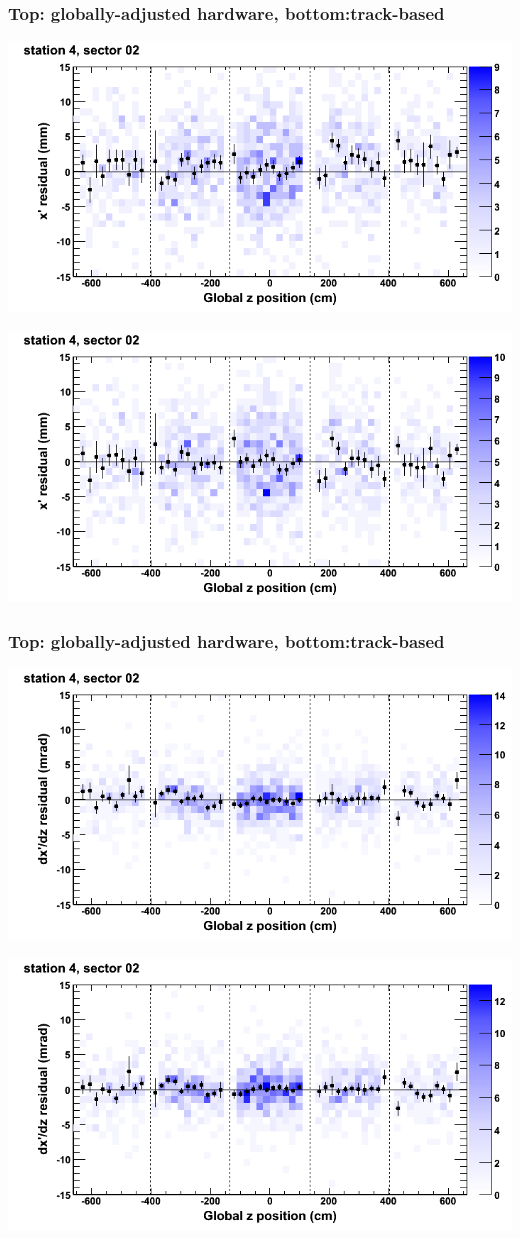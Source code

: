 \documentclass[compress]{beamer}
\begin{document}
\begin{frame}
\frametitle{Top: globally-adjusted hardware, bottom:track-based}
\includegraphics[width=0.7\linewidth]{NOV4_mapplots_HW/DTvsz_st4sec02_x.png}

\includegraphics[width=0.7\linewidth]{NOV4_mapplots/DTvsz_st4sec02_x.png}
\end{frame}

\begin{frame}
\frametitle{Top: globally-adjusted hardware, bottom:track-based}
\includegraphics[width=0.7\linewidth]{NOV4_mapplots_HW/DTvsz_st4sec02_dxdz.png}

\includegraphics[width=0.7\linewidth]{NOV4_mapplots/DTvsz_st4sec02_dxdz.png}
\end{frame}
\end{document}
